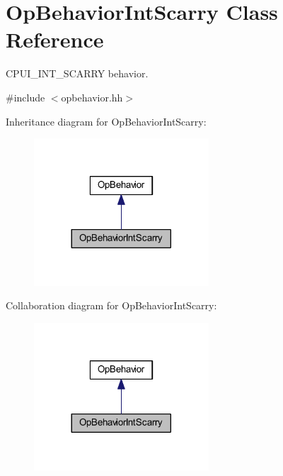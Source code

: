 \hypertarget{class_op_behavior_int_scarry}{}\section{Op\+Behavior\+Int\+Scarry Class Reference}
\label{class_op_behavior_int_scarry}


C\+P\+U\+I\+\_\+\+I\+N\+T\+\_\+\+S\+C\+A\+R\+RY behavior.  




{\ttfamily \#include $<$opbehavior.\+hh$>$}



Inheritance diagram for Op\+Behavior\+Int\+Scarry\+:
\nopagebreak
\begin{figure}[H]
\begin{center}
\leavevmode
\includegraphics[width=185pt]{class_op_behavior_int_scarry__inherit__graph}
\end{center}
\end{figure}


Collaboration diagram for Op\+Behavior\+Int\+Scarry\+:
\nopagebreak
\begin{figure}[H]
\begin{center}
\leavevmode
\includegraphics[width=185pt]{class_op_behavior_int_scarry__coll__graph}
\end{center}
\end{figure}
